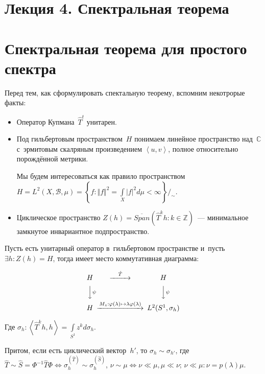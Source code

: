 \documentclass{article}
\begin{document}
\section*{Лекция 4. Спектральная теорема}
\resetcntrs

\section{Спектральная теорема для простого спектра}

Перед тем, как сформулировать спектальную теорему, вспомним некотрорые факты:
\begin{itemize}
	\item Оператор Купмана~$\hat T^t$ унитарен.
	\item Под гильбертовым пространством~$H$ понимаем линейное пространство
		над~$\mathbb{C}$ с~эрмитовым скалряным произведением $\left< u, v \right>$,
		полное относительно порождённой метрики.

		Мы будем интересоваться как правило пространством~$H = L^2(X, \mathcal{B},
		\mu) = \left\{f: \Vert f \Vert^2 = \int\limits_X |f|^2 d\mu < \infty
		\right\} /_\sim$.
	\item Циклическое пространство $Z(h) = \overline{Span}(\hat T^k h: k \in
		\mathbb{Z})$~--- минимальное замкнутое инвариантное подпространство.
\end{itemize}

\begin{theorem}
	Пусть есть унитарный оператор в~гильбертовом пространстве и~пусть $\exists h:
	Z(h) = H$, тогда имеет место коммутативная диаграмма:

	$$\begin{CD}
	H           @>\hat T>>  H\\
	@VV\psi V              @VV\psi V\\
	H @> M_z: \phi(\lambda) \mapsto \lambda \phi(\lambda) >> L^2(S^1,\sigma_h)
	\end{CD}$$

	Где $\sigma_h: \left<\hat T^kh, h\right> = \int\limits_{S^1} z^k d\sigma_h$.

	Притом, если есть циклический вектор~$h'$, то $\sigma_h \sim \sigma_{h'}$, где
	$\hat T \sim \hat S = \Phi^{-1} \hat T \Phi \Leftrightarrow \sigma^{(\hat
	T)}_h \sim \sigma^{(\hat S)}_h$, $\nu \sim \mu \Leftrightarrow \nu \ll \mu,
	\mu \ll \nu$; $\nu \ll \mu: \nu = p(\lambda) \mu$.
\end{theorem}
\end{document}
